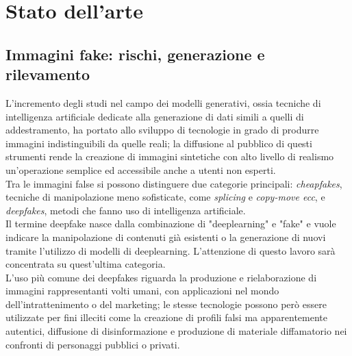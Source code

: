 \chapter{Stato dell'arte}\label{ch:theory}
\section{Immagini fake: rischi, generazione e rilevamento}\label{sec:fakeimg}
L'incremento degli studi nel campo dei modelli generativi, ossia tecniche di intelligenza artificiale dedicate alla generazione di dati simili a quelli di addestramento, ha portato allo sviluppo di tecnologie in grado di produrre immagini indistinguibili da quelle reali; la diffusione al pubblico di questi strumenti rende la creazione di immagini sintetiche con alto livello di realismo un'operazione semplice ed accessibile anche a utenti non esperti.\\ 
Tra le immagini false si possono distinguere due categorie principali: \textit{cheapfakes}, tecniche di manipolazione meno sofisticate, come \textit{splicing} e \textit{copy-move ecc}, e  \textit{deepfakes}, metodi che fanno uso di intelligenza artificiale.\\Il termine deepfake nasce dalla combinazione di "deeplearning" e "fake" e vuole indicare la manipolazione di contenuti già esistenti o la generazione di nuovi tramite l'utilizzo di modelli di deeplearning. L'attenzione di questo lavoro sarà concentrata su quest'ultima categoria.\\
L'uso più comune dei deepfakes riguarda la produzione e rielaborazione di immagini rappresentanti volti umani, con applicazioni nel mondo dell'intrattenimento o del marketing; le stesse tecnologie possono però essere utilizzate per fini illeciti come la creazione di profili falsi ma apparentemente autentici, diffusione di disinformazione e produzione di materiale diffamatorio nei confronti di personaggi pubblici o privati.
